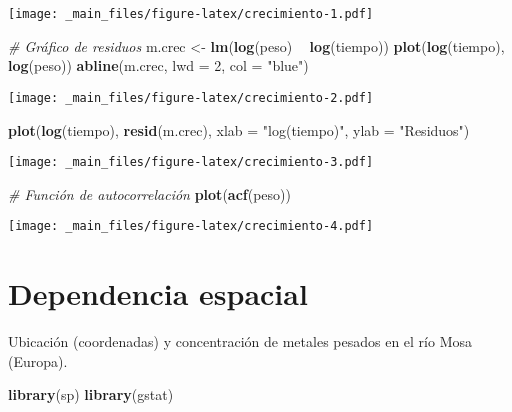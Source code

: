 \documentclass[
]{book}
\newenvironment{Shaded}{\begin{snugshade}}{\end{snugshade}}
\newcommand{\CommentTok}[1]{\textcolor[rgb]{0.56,0.35,0.01}{\textit{#1}}}
\newcommand{\DataTypeTok}[1]{\textcolor[rgb]{0.13,0.29,0.53}{#1}}
\newcommand{\DecValTok}[1]{\textcolor[rgb]{0.00,0.00,0.81}{#1}}
\newcommand{\KeywordTok}[1]{\textcolor[rgb]{0.13,0.29,0.53}{\textbf{#1}}}
\newcommand{\NormalTok}[1]{#1}
\newcommand{\OperatorTok}[1]{\textcolor[rgb]{0.81,0.36,0.00}{\textbf{#1}}}
\newcommand{\StringTok}[1]{\textcolor[rgb]{0.31,0.60,0.02}{#1}}
\begin{document}
\texttt{[image: \_main\_files/figure-latex/crecimiento-1.pdf]}

\begin{Shaded}
\begin{Highlighting}[]
\CommentTok{# Gráfico de residuos}
\NormalTok{m.crec <-}\StringTok{ }\KeywordTok{lm}\NormalTok{(}\KeywordTok{log}\NormalTok{(peso) }\OperatorTok{~}\StringTok{ }\KeywordTok{log}\NormalTok{(tiempo))}
\KeywordTok{plot}\NormalTok{(}\KeywordTok{log}\NormalTok{(tiempo), }\KeywordTok{log}\NormalTok{(peso))}
\KeywordTok{abline}\NormalTok{(m.crec, }\DataTypeTok{lwd =} \DecValTok{2}\NormalTok{, }\DataTypeTok{col =} \StringTok{"blue"}\NormalTok{)}
\end{Highlighting}
\end{Shaded}

\texttt{[image: \_main\_files/figure-latex/crecimiento-2.pdf]}

\begin{Shaded}
\begin{Highlighting}[]
\KeywordTok{plot}\NormalTok{(}\KeywordTok{log}\NormalTok{(tiempo), }\KeywordTok{resid}\NormalTok{(m.crec), }\DataTypeTok{xlab =} \StringTok{"log(tiempo)"}\NormalTok{, }\DataTypeTok{ylab =} \StringTok{"Residuos"}\NormalTok{)}
\end{Highlighting}
\end{Shaded}

\texttt{[image: \_main\_files/figure-latex/crecimiento-3.pdf]}

\begin{Shaded}
\begin{Highlighting}[]
\CommentTok{# Función de autocorrelación}
\KeywordTok{plot}\NormalTok{(}\KeywordTok{acf}\NormalTok{(peso))}
\end{Highlighting}
\end{Shaded}

\texttt{[image: \_main\_files/figure-latex/crecimiento-4.pdf]}

\hypertarget{dependencia-espacial}{%
\section{Dependencia espacial}\label{dependencia-espacial}}

Ubicación (coordenadas) y concentración de metales pesados en el río Mosa (Europa).

\begin{Shaded}
\begin{Highlighting}[]
\KeywordTok{library}\NormalTok{(sp)}
\KeywordTok{library}\NormalTok{(gstat)}
\end{Highlighting}
\end{Shaded}
\end{document}
